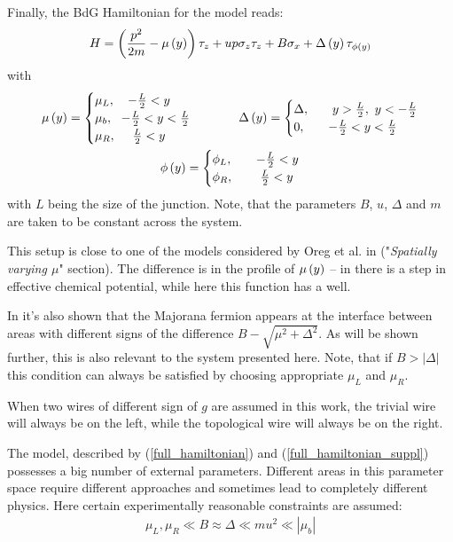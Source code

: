 Finally, the BdG Hamiltonian for the model reads:
\begin{equation}
\label{full_hamiltonian}
H
=
\left(
	\frac{p^2}{2m}
	-\mu\left(y\right)
\right)\tau_z
+
u p \sigma_z \tau_z
+
B\sigma_x	
+
\Delta\left(y\right)\tau_{\phi\left(y\right)}
\end{equation}
with
\begin{gather}
\label{full_hamiltonian_suppl}
	\mu\left(y\right)
	=
	\begin{cases}
		\mu_L,~~~  -\frac{L}{2}<y\\
		\mu_b,~~ -\frac{L}{2} <y <\frac{L}{2}\\
		\mu_R, ~~~~ \frac{L}{2}< y  
	\end{cases}
	~~~~~~~~
	\Delta\left(y\right)
	=
	\begin{cases}
		\Delta,&~~~  y>\frac{L}{2},~y<-\frac{L}{2}\\
		0,
		&~~ -\frac{L}{2} <y <\frac{L}{2}\\
	\end{cases}
		\\
	\phi\left(y\right)
	=
	\begin{cases}
	\phi_L,&~~~  -\frac{L}{2}<y\\
	\phi_R, &~~~~ \frac{L}{2}< y 
	\end{cases}
\end{gather}
with $ L $ being the size of the junction. Note, that the parameters $ B $, $ u $, $ \Delta $ and $ m $ are taken to be constant across the system.
 
  This setup is close to one of the models  considered by Oreg et al. in \cite{Oreg_2010} ("\textit{Spatially varying $ \mu $}" section). The difference is in the profile of $ \mu\left(y\right) $ -- in \cite{Oreg_2010}  there is a step in effective chemical potential, while here this function has a well.  
  
 In \cite{Oreg_2010} it's also shown that the Majorana fermion appears at the interface between areas with different signs of the difference $ B-\sqrt{\mu^2+\Delta^2} $.  As will be shown further, this is also relevant to the  system presented here. Note, that if $ B > \left|\Delta\right| $ this condition can always be satisfied by choosing appropriate $ \mu_L $ and $ \mu_R $. 
 
 When two wires of different sign of $ g $ are assumed in this work, the trivial wire will always be on the left, while the topological wire will always be on the right.

 The model, described by (\ref{full_hamiltonian}) and (\ref{full_hamiltonian_suppl}) possesses a big number of external parameters. Different areas in this parameter space require different approaches and sometimes lead to completely different physics. Here certain experimentally reasonable constraints are assumed:
  \begin{gather}
 \label{constraints}
 	\mu_L,\mu_R \ll B \approx \Delta \ll mu^2\ll \left|\mu_b\right|
 \end{gather} 

